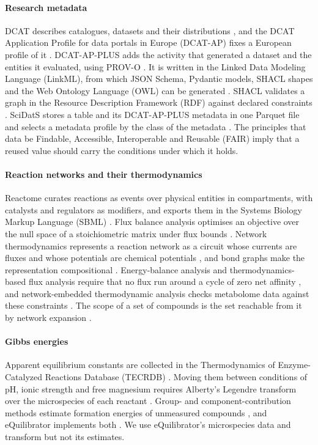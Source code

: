 \documentclass[5p]{elsarticle}
\theoremstyle{definition}
\theoremstyle{plain}
\begin{document}
\paragraph{Research metadata}
DCAT describes catalogues, datasets and their distributions \citep{w3c2024dcat}, and the DCAT Application Profile for data portals in Europe (DCAT-AP) fixes a European profile of it \citep{semic2024dcatap}.
DCAT-AP-PLUS adds the activity that generated a dataset and the entities it evaluated, using PROV-O \citep{lebo2013provo,linke2025dcatapplus}.
It is written in the Linked Data Modeling Language (LinkML), from which JSON Schema, Pydantic models, SHACL shapes and the Web Ontology Language (OWL) can be generated \citep{moxon2021linkml}.
SHACL validates a graph in the Resource Description Framework (RDF) against declared constraints \citep{w3c2017shacl}.
SciDatS stores a table and its DCAT-AP-PLUS metadata in one Parquet file and selects a metadata profile by the class of the metadata \citep{doerr2026scidats,apache2013parquet}.
The principles that data be Findable, Accessible, Interoperable and Reusable (FAIR) \citep{wilkinson2016fair} imply that a reused value should carry the conditions under which it holds.

\paragraph{Reaction networks and their thermodynamics}
Reactome curates reactions as events over physical entities in compartments, with catalysts and regulators as modifiers, and exports them in the Systems Biology Markup Language (SBML) \citep{gillespie2022reactome,hucka2003sbml}.
Flux balance analysis optimises an objective over the null space of a stoichiometric matrix under flux bounds \citep{orth2010fba}.
Network thermodynamics represents a reaction network as a circuit whose currents are fluxes and whose potentials are chemical potentials \citep{oster1971network}, and bond graphs make the representation compositional \citep{gawthrop2014bond}.
Energy-balance analysis and thermodynamics-based flux analysis require that no flux run around a cycle of zero net affinity \citep{beard2002energy,henry2007tfba}, and network-embedded thermodynamic analysis checks metabolome data against these constraints \citep{kummel2006net}.
The scope of a set of compounds is the set reachable from it by network expansion \citep{handorf2005expanding}.

\paragraph{Gibbs energies}
Apparent equilibrium constants are collected in the Thermodynamics of Enzyme-Catalyzed Reactions Database (TECRDB) \citep{goldberg2004tecrdb}.
Moving them between conditions of pH, ionic strength and free magnesium requires Alberty's Legendre transform over the microspecies of each reactant \citep{alberty1998calculation,alberty2003thermodynamics}.
Group- and component-contribution methods estimate formation energies of unmeasured compounds \citep{jankowski2008group,noor2013component}, and eQuilibrator implements both \citep{flamholz2012equilibrator,beber2022equilibrator}.
We use eQuilibrator's microspecies data and transform but not its estimates.
\end{document}
